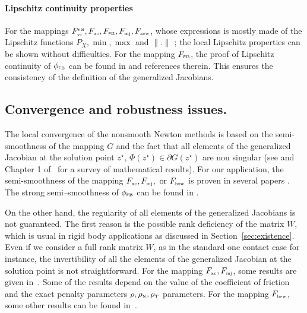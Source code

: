 



\paragraph{Lipschitz continuity properties} For the mappings $F^{\hbox{\sf \tiny{nat}}}_{\hbox{\tiny{vi}}}, F_{\hbox{\tiny{ac}}}, F_{{\hbox{\tiny{\textsf FB}}}}, F_{{\hbox{\tiny{mj}}}}, F_{{\hbox{\tiny{xsw}}}}$,   {whose expressions is mostly made of}
the Lipschitz functions $P_X,\min,\max$ and $\|.\|$ ; the local Lipschitz properties can be shown without difficulties. For the mapping  $F_{{\hbox{\tiny{\textsf FB}}}}$, the proof of Lipschitz continuity of $\phi_{\hbox{\tiny{\textsf FB}}}$ can be found in \citep{Sun.Sun_MP2005} and references therein. This ensures the consistency of the definition of the generalized Jacobians.


\subsection{Convergence and robustness issues.}


The local convergence of the nonsmooth Newton methods is based on the semi-smoothness of the mapping $G$ and the fact that all elements of the generalized Jacobian at the solution point $z^\star$,  $\Phi(z^\star) \in \partial G(z^\star)$ are non singular (see \cite{Qi.Sun1993} and Chapter 1 of~\cite{Qi.ea_Book2018} for a survey of mathematical results). For our application, the semi-smoothness of the mapping $F_{\hbox{\tiny{ac}}},  F_{{\hbox{\tiny{mj}}}},  \text{ or } F_{\hbox{\tiny{hsw}}} $ is proven in several papers \cite{Christensen.Pang1998,Hueber.ea_SJSC2008}. The strong semi--smoothness of $\phi_{\hbox{\tiny{\textsf FB}}}$ can be found in \citep{Sun.Sun_MP2005}.

On the other hand, the regularity of all elements of the generalized Jacobians is not guaranteed. The first reason is the possible rank deficiency of the matrix $W$, which is usual in rigid body applications as discussed in Section~\ref{sec:existence}. Even if we consider a full rank matrix $W$, as in the standard one contact case for instance, the invertibility of all the elements of the generalized Jacobian at the solution point is not straightforward. For the mapping $F_{\hbox{\tiny{ac}}},  F_{{\hbox{\tiny{mj}}}}$, some results are given in~\cite{Alart1993,Alart95,Jourdan.Alart.ea98}. Some of the results depend on the value of the coefficient of friction and the exact penalty parameters  $\rho, \rho_{\hbox{\tiny{N}}}, \rho_{\hbox{\tiny{T}}}$ parameters. For the mapping $F_{\hbox{\tiny{hsw}}}$, some other results can be found in~\cite{Hueber.ea_SJSC2008}.

